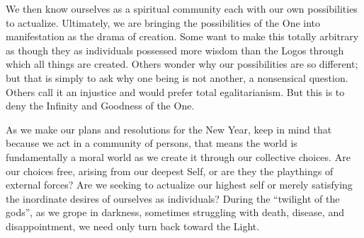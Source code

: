 We then know ourselves as a spiritual community each with our own possibilities to actualize. Ultimately, we are bringing the possibilities of the One into manifestation as the drama of creation. Some want to make this totally arbitrary as though they as individuals possessed more wisdom than the Logos through which all things are created. Others wonder why our possibilities are so different; but that is simply to ask why one being is not another, a nonsensical question. Others call it an injustice and would prefer total egalitarianism. But this is to deny the Infinity and Goodness of the One.

As we make our plans and resolutions for the New Year, keep in mind that because we act in a community of persons, that means the world is fundamentally a moral world as we create it through our collective choices. Are our choices free, arising from our deepest Self, or are they the playthings of external forces? Are we seeking to actualize our highest self or merely satisfying the inordinate desires of ourselves as individuals? During the ``twilight of the gods'', as we grope in darkness, sometimes struggling with death, disease, and disappointment, we need only turn back toward the Light.



